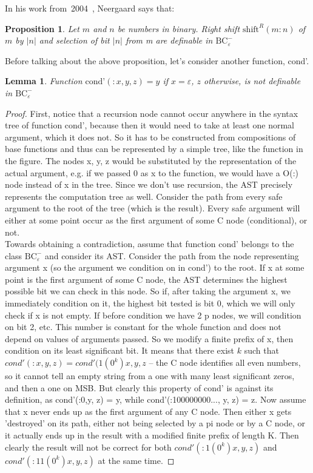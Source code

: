 \documentclass[en]  {pracamgr}
\newcommand{\bcem}{\ensuremath{\text{BC}_{\varepsilon}^-}}
\newtheorem{lemma}[thm]{Lemma}
\newtheorem{prop}{Proposition}
\begin{document}
In his work from~2004~\cite{10.1007/978-3-540-30477-7_21}, Neergaard says that: 
\begin{prop}
  Let $m$ and $n$ be numbers in binary. Right shift $\text{shift}^R(m:n)$ of $m$ by $|n|$ and selection of bit $|n|$
from m are definable in \bcem
\end{prop}

Before talking about the above proposition, let's consider another function, cond'.



\begin{lemma}
  Function $\text{cond'}(:x, y, z) = y$ if $x = \varepsilon$, $z$ otherwise, is not definable in \bcem
\end{lemma}
\begin{proof}
  First, notice that a recursion node cannot occur anywhere in the syntax tree of function cond', because then it would need to take at least one normal argument, which it does not. So it has to be constructed from compositions of base functions and thus can be represented by a simple tree, like the function in the figure. The nodes x, y, z would be substituted by the representation of the actual argument, e.g. if we passed 0 as x to the function, we would have a O(:) node 
  instead of x in the tree. Since we don't use recursion, the AST precisely represents the computation tree as well. Consider the path from every safe argument to the root of the tree (which is the result). Every safe argument will either at some point occur as the first argument of some C node (conditional), or not. \\
  Towards obtaining a contradiction, assume that function cond' belongs to the class $\bcem$ and consider its AST.
  Consider the path from the node representing argument x (so the argument we condition on in cond') to the root.
If x at some point is the first argument of some C node, the AST determines the highest possible bit we can check in this node. So if, after taking the argument x, we immediately condition on it, the highest bit tested is bit 0, which we will only check if x is not empty. If before condition we have 2 p nodes, we will condition on bit 2, etc. This number is constant for the whole function and does not depend on values of arguments passed. So we modify a finite prefix of x, then condition on its least significant bit. It means that there exist $k$ such that $cond'(:x, y, z) = cond'(1(0^k)x, y, z$ -- the C node identifies all even numbers, so it cannot tell an empty string from a one with many least significant zeros, and then a one on MSB. But clearly this property of cond' is against its definition, as cond'(:0,y, z) = y, while cond'(:100000000..., y, z) = z.
  Now assume that x never ends up as the first argument of any C node. Then either x gets 'destroyed' on its path, either not being selected by a pi node or by a C node, or it actually ends up in the result with a modified finite prefix of length K. Then clearly the result will not be correct for both $cond'(:1(0^k)x, y, z)$ and $cond'(:11(0^k)x, y, z)$ at the same time.
\end{proof}
\end{document}
